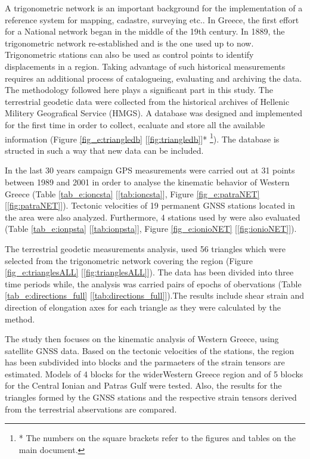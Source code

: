 \begin{extsum}
A trigonometric network is an important background for the implementation of a reference system for mapping, cadastre, surveying etc.. In Greece, the first effort for a National network began in the middle of the 19th century. In 1889, the trigonometric network re-established and is the one used up to now. Trigonometric stations can also be used as control points to identify displacements in a region. 
Taking advantage of such historical measurements requires an additional process of catalogueing, evaluating and archiving the data. The methodology followed here plays a significant part in this study. The terrestrial geodetic data were collected from the historical archives of Hellenic Militery Geografical Service (HMGS). A database was designed and implemented for the first time in order to collect, ecaluate and store all the available information (Figure \ref{fig_e:triangledb} [\ref{fig:triangledb}]* \footnote{* The numbers on the square brackets refer to the figures and tables on the main document.}). The database is structed in such a way that new data can be included.

In the last 30 years campaign GPS measurements were carried out at 31 points between 1989 and 2001 in order to analyse the kinematic behavior of Western Greece (Table \ref{tab_e:ioncsta} [\ref{tab:ioncsta}], Figure \ref{fig_e:patraNET} [\ref{fig:patraNET}]). Tectonic velocities of 19 permanent GNSS stations located in the area were also analyzed. Furthermore, 4 stations used by \citet{Hollenstein2008} were also evaluated (Table \ref{tab_e:ionpsta} [\ref{tab:ionpsta}], Figure \ref{fig_e:ionioNET} [\ref{fig:ionioNET}]).

The terrestrial geodetic measurements analysis, used 56 triangles which were selected from the trigonometric network covering the region (Figure \ref{fig_e:trianglesALL} [\ref{fig:trianglesALL}]). The data has been divided into three time periods while, the analysis was carried pairs of epochs of obervations (Table \ref{tab_e:directions_full} [\ref{tab:directions_full}]).The results include shear strain and direction of elongation axes for each triangle as they were calculated by the \citet{Frank1966} method.

The study then focuses on the kinematic analysis of Western Greece, using satellite GNSS data. Based on the tectonic velocities of the stations, the region has been subdivided into blocks and the parmaeters of the strain tensors are estimated. Models of 4 blocks for the wider ​​Western Greece region and of 5 blocks for the Central Ionian and Patras Gulf were tested. Also, the results for the triangles formed by the GNSS stations and the respective strain tensors derived from the terrestrial abservations are compared.


\end{extsum}
